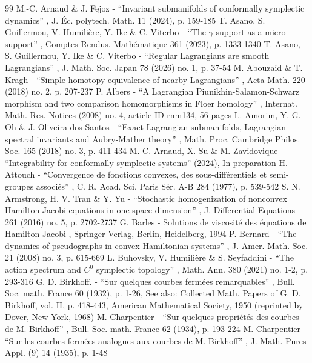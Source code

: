 \documentclass[10pt]{amsart}
\theoremstyle{definition}
\begin{document}
\begin{thebibliography}{99}
 M.-C. Arnaud \& J. Fejoz - “Invariant submanifolds of conformally symplectic dynamics” , J. Éc. polytech. Math. 11 (2024), p. 159-185
 T. Asano, S. Guillermou, V. Humilière, Y. Ike \& C. Viterbo - “The $\gamma $-support as a micro-support” , Comptes Rendus. Mathématique 361 (2023), p. 1333-1340
 T. Asano, S. Guillermou, Y. Ike \& C. Viterbo - “Regular Lagrangians are smooth Lagrangians” , J. Math. Soc. Japan 78 (2026) no. 1, p. 37-54
 M. Abouzaid \& T. Kragh - “Simple homotopy equivalence of nearby Lagrangians” , Acta Math. 220 (2018) no. 2, p. 207-237
 P. Albers - “A Lagrangian Piunikhin-Salamon-Schwarz morphism and two comparison homomorphisms in Floer homology” , Internat. Math. Res. Notices (2008) no. 4, article ID rnm134, 56 pages
 L. Amorim, Y.-G. Oh \& J. Oliveira dos Santos - “Exact Lagrangian submanifolds, Lagrangian spectral invariants and Aubry-Mather theory” , Math. Proc. Cambridge Philos. Soc. 165 (2018) no. 3, p. 411-434
 M.-C. Arnaud, X. Su \& M. Zavidovique - “Integrability for conformally symplectic systems” (2024), In preparation
 H. Attouch - “Convergence de fonctions convexes, des sous-différentiels et semi-groupes associés” , C. R. Acad. Sci. Paris Sér. A-B 284 (1977), p. 539-542
 S. N. Armstrong, H. V. Tran \& Y. Yu - “Stochastic homogenization of nonconvex Hamilton-Jacobi equations in one space dimension” , J. Differential Equations 261 (2016) no. 5, p. 2702-2737
 G. Barles - Solutions de viscosité des équations de Hamilton-Jacobi , Springer-Verlag, Berlin, Heidelberg, 1994
 P. Bernard - “The dynamics of pseudographs in convex Hamiltonian systems” , J. Amer. Math. Soc. 21 (2008) no. 3, p. 615-669
 L. Buhovsky, V. Humilière \& S. Seyfaddini - “The action spectrum and $C^0$ symplectic topology” , Math. Ann. 380 (2021) no. 1-2, p. 293-316
 G. D. Birkhoff. - “Sur quelques courbes fermées remarquables” , Bull. Soc. math. France 60 (1932), p. 1-26, See also: Collected Math. Papers of G. D. Birkhoff, vol. II, p. 418-443, American Mathematical Society, 1950 (reprinted by Dover, New York, 1968)
 M. Charpentier - “Sur quelques propriétés des courbes de M. Birkhoff” , Bull. Soc. math. France 62 (1934), p. 193-224
 M. Charpentier - “Sur les courbes fermées analogues aux courbes de M. Birkhoff” , J. Math. Pures Appl. (9) 14 (1935), p. 1-48

\end{thebibliography}
\end{document}
